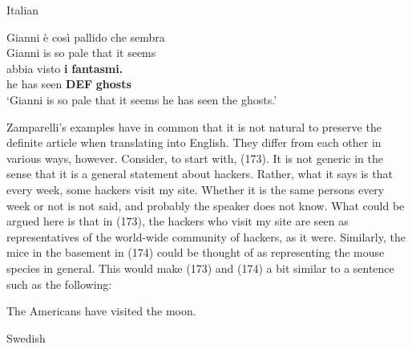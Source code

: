 \label{bkm:Ref172696628}Italian



 \ea\label{}
\gll Gianni  è  così  pallido  che  sembra\\


Gianni  is  so  pale  that  it seems\\

 \ea\label{}
\gll abbia  visto  \textbf{i} \textbf{fantasmi.}   \\


he has  seen  \textbf{DEF} \textbf{ghosts}   \\

\glt ‘Gianni is so pale that it seems he has seen the ghosts.’

\z

Zamparelli’s examples have in common that it is not natural to preserve the definite article when translating into English. They differ from each other in various ways, however. Consider, to start with, (173). It is not generic in the sense that it is a general statement about hackers. Rather, what it says is that every week, some hackers visit my site. Whether it is the same persons every week or not is not said, and probably the speaker does not know. What could be argued here is that in (173), the hackers who visit my site are seen as representatives of the world-wide community of hackers, as it were. Similarly, the mice in the basement in (174) could be thought of as representing the mouse species in general. This would make (173) and (174) a bit similar to a sentence such as the following: 


\item 

\label{bkm:Ref69031158}The Americans have visited the moon.


\item 

\label{bkm:Ref77501116}Swedish

